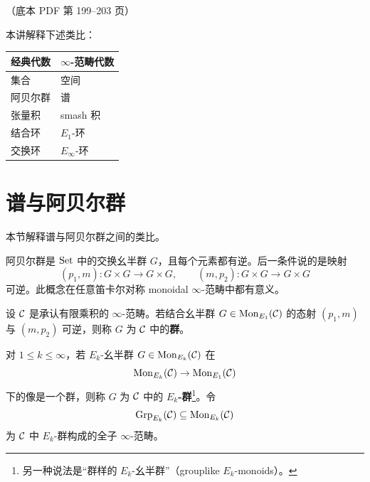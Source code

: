 \begin{center}\small\color{black!55}（底本 PDF 第 199–203 页）\end{center}

本讲解释下述类比：
\begin{center}
\begin{tabular}{ll}
\hline
经典代数 & $\infty$-范畴代数 \\
\hline
集合 & 空间 \\
阿贝尔群 & 谱 \\
张量积 & smash 积 \\
结合环 & $E_{1}$-环 \\
交换环 & $E_{\infty}$-环 \\
\hline
\end{tabular}
\end{center}


\section{谱与阿贝尔群}

\nitem\label{L27-1.1}
本节解释谱与阿贝尔群之间的类比。

\nitem\label{L27-1.2}
阿贝尔群是 $\operatorname{Set}$ 中的交换幺半群 $G$，且每个元素都有逆。后一条件说的是映射
\[
(p_{1},m)\colon G\times G\to G\times G,\qquad (m,p_{2})\colon G\times G\to G\times G
\]
可逆。此概念在任意笛卡尔对称 monoidal $\infty$-范畴中都有意义。

\begin{definition}\label{L27-1.3}
设 $\mathcal{C}$ 是承认有限乘积的 $\infty$-范畴。若结合幺半群 $G\in\operatorname{Mon}_{E_1}(\mathcal{C})$ 的态射 $(p_{1},m)$ 与 $(m,p_{2})$ 可逆，则称 $G$ 为 $\mathcal{C}$ 中的\textbf{群}。

对 $1\le k\le\infty$，若 $E_{k}$-幺半群 $G\in\operatorname{Mon}_{E_k}(\mathcal{C})$ 在
\[
\operatorname{Mon}_{E_k}(\mathcal{C})\to\operatorname{Mon}_{E_1}(\mathcal{C})
\]
下的像是一个群，则称 $G$ 为 $\mathcal{C}$ 中的 \textbf{$E_{k}$-群}\footnote{另一种说法是“群样的 $E_k$-幺半群”（grouplike $E_k$-monoids）。}。令
\[
\operatorname{Grp}_{E_k}(\mathcal{C})\subseteq\operatorname{Mon}_{E_k}(\mathcal{C})
\]
为 $\mathcal{C}$ 中 $E_{k}$-群构成的全子 $\infty$-范畴。
\end{definition}

